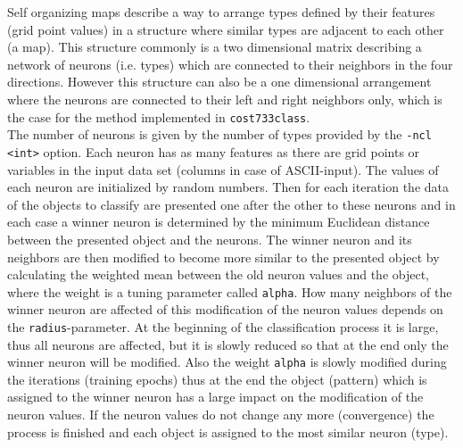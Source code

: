 \documentclass[12pt, oneside, a4paper, headsepline, plainheadsepline]{scrbook}
\begin{document}
Self organizing maps describe a way to arrange types defined by their features (grid point values) in a structure
where similar types are adjacent to each other (a map). This structure commonly is a two dimensional matrix describing
a network of neurons (i.e. types) which are connected to their neighbors in the four directions. 
However this structure can also be a one dimensional arrangement where the neurons are connected to their left and right
neighbors only, which is the case for the method implemented in \verb+cost733class+. \\
The number of neurons is given by the number of types provided by the \verb+-ncl <int>+ option. Each neuron has as many features
as there are grid points or variables in the input data set (columns in case of ASCII-input). The values of each neuron are initialized 
by random numbers. Then for each iteration the data of the objects to classify are presented one after the other to these neurons and
in each case a winner neuron is determined by the minimum Euclidean distance between the presented object and the neurons. The winner neuron and
its neighbors are then modified to become more similar to the presented object by calculating the weighted mean between the old neuron 
values and the object, where the weight is a tuning parameter called \verb+alpha+. How many neighbors of the winner neuron
are affected of this modification of the neuron values depends on the \verb+radius+-parameter. At the beginning of the classification process
it is large, thus all neurons are affected, but it is slowly reduced so that at the end only the winner neuron will be modified. Also the weight
\verb+alpha+ is slowly modified during the iterations (training epochs) thus at the end the object (pattern) which is assigned to the winner
neuron has a large impact on the modification of the neuron values.
If the neuron values do not change any more (convergence) the process is finished and each object is assigned to the most similar neuron (type).
\end{document}
